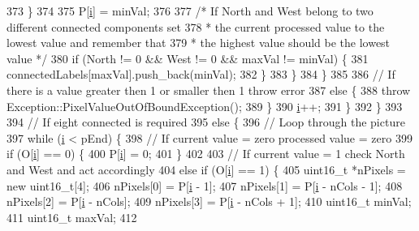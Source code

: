 \begin{DoxyCode}
373           \}
374 
375           P[\hyperlink{_comparision_pictures_2_createtest_image_8m_a6f6ccfcf58b31cb6412107d9d5281426}{i}] = minVal;
376 
377           \textcolor{comment}{/* If North and West belong to two different connected components set}
378 \textcolor{comment}{           * the current processed value to the lowest value and remember that}
379 \textcolor{comment}{           * the highest value should be the lowest value */}
380           \textcolor{keywordflow}{if} (North != 0 && West != 0 && maxVal != minVal) \{
381             connectedLabels[maxVal].push\_back(minVal);
382           \}
383         \}
384       \}
385 
386       \textcolor{comment}{// If there is a value greater then 1 or smaller then 1 throw error}
387       \textcolor{keywordflow}{else} \{
388         \textcolor{keywordflow}{throw} Exception::PixelValueOutOfBoundException();
389       \}
390       \hyperlink{_comparision_pictures_2_createtest_image_8m_a6f6ccfcf58b31cb6412107d9d5281426}{i}++;
391     \}
392   \}
393 
394   \textcolor{comment}{// If eight connected is required}
395   \textcolor{keywordflow}{else} \{
396     \textcolor{comment}{// Loop through the picture}
397     \textcolor{keywordflow}{while} (\hyperlink{_comparision_pictures_2_createtest_image_8m_a6f6ccfcf58b31cb6412107d9d5281426}{i} < pEnd) \{
398       \textcolor{comment}{// If current value = zero processed value = zero}
399       \textcolor{keywordflow}{if} (O[\hyperlink{_comparision_pictures_2_createtest_image_8m_a6f6ccfcf58b31cb6412107d9d5281426}{i}] == 0) \{
400         P[\hyperlink{_comparision_pictures_2_createtest_image_8m_a6f6ccfcf58b31cb6412107d9d5281426}{i}] = 0;
401       \}
402 
403       \textcolor{comment}{// If current value = 1 check North and West and act accordingly}
404       \textcolor{keywordflow}{else} \textcolor{keywordflow}{if} (O[\hyperlink{_comparision_pictures_2_createtest_image_8m_a6f6ccfcf58b31cb6412107d9d5281426}{i}] == 1) \{
405         uint16\_t *nPixels = \textcolor{keyword}{new} uint16\_t[4];
406         nPixels[0] = P[\hyperlink{_comparision_pictures_2_createtest_image_8m_a6f6ccfcf58b31cb6412107d9d5281426}{i} - 1];
407         nPixels[1] = P[\hyperlink{_comparision_pictures_2_createtest_image_8m_a6f6ccfcf58b31cb6412107d9d5281426}{i} - nCols - 1];
408         nPixels[2] = P[\hyperlink{_comparision_pictures_2_createtest_image_8m_a6f6ccfcf58b31cb6412107d9d5281426}{i} - nCols];
409         nPixels[3] = P[\hyperlink{_comparision_pictures_2_createtest_image_8m_a6f6ccfcf58b31cb6412107d9d5281426}{i} - nCols + 1];
410         uint16\_t minVal;
411         uint16\_t maxVal;
412 

\end{DoxyCode}
